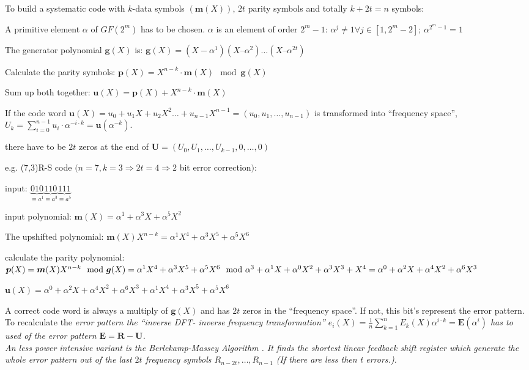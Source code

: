 To build a systematic code with $k$-data symbols $(\bm m(X))$, $2t$ parity symbols and totally $k+2t=n$ symbols:
\begin{liste}
\item A primitive element $\alpha$ of $GF(2^m)$ has to be chosen. 
$\alpha$ is an element of order $2^m-1$: $\alpha^j\neq 1 \forall j\in [1,2^m-2]$; $\alpha^{2^m-1}=1$
\item The generator polynomial $\bm g(X)$ is:  $\bm g(X)=(X - \alpha^1) (X – \alpha^2)\ldots (X – \alpha^{2t})$
\item Calculate the parity symbols: $\bm p(X)=X^{n-k}\cdot \bm m(X) \mod \bm g(X)$
\item Sum up both together: $\bm u(X)=\bm p(X) +X^{n-k}\cdot \bm m(X) $
\item If the code word $\bm u(X) = u_0 + u_1 X+u_2 X^2\ldots+u_{n-1}X^{n-1} = ( u_0,  u_1, \ldots,  u_{n-1})$ is transformed into ``frequency space'', 
$U_k = \sum\limits_{i=0}^{n-1} u_i\cdot \alpha^{-i\cdot k}=\bm u(\alpha^{-k})$.
\item there have to be $2t$ zeros at the end of $\bm U=(U_0,U_1,\ldots,U_{k-1},0,\ldots,0)$
\end{liste}
e.g. (7,3)R-S code $(n=7, k=3 \Rightarrow 2t=4 \Rightarrow 2$ bit error correction$)$:
\begin{liste}
\item input: $\underbrace{010}_{\equiv a^1} \underbrace{110}_{\equiv a^3} \underbrace{111}_{\equiv a^5}$
\item input polynomial: $\bm m(X)=\alpha^1 + \alpha^3 X + \alpha^5 X^2$ 
\item The upshifted polynomial: $\bm m(X) X^{n-k}=\alpha^1 X^4 + \alpha^3 X^5 + \alpha^5 X^6$
\item calculate the parity polynomial: $\bm p(X)=\bm m(X) X^{n-k} \mod \bm g(X)\\
= \alpha^1 X^4 + \alpha^3 X^5 + \alpha^5 X^6 \mod \alpha^3 + \alpha^1 X + \alpha^0 X^2+\alpha^3 X^3+ X^4=\alpha^0+\alpha^2 X+\alpha^4 X^2 + \alpha^6 X^3$
\item $\bm u(X)=\alpha^0 + \alpha^2 X + \alpha^4 X^2 + \alpha^6 X^3+ \alpha^1 X^4 + \alpha^3 X^5 + \alpha^5 X^6$
\end{liste}
A correct code word is always a multiply of $\bm g(X)$ and has $2t$ zeros in the ``frequency space''. If not, this bit's represent the error pattern. 
To recalculate the \em error pattern \em the ``inverse DFT- inverse frequency transformation'' 
$e_i(X)=\frac{1}{n}\sum\limits_{k=1}^n E_k(X) \alpha^{i \cdot k}=\bm E(\alpha^i)$ has to used of the  error pattern $\bm E= \bm R - \bm U$.\\
An less power intensive variant is the \em Berlekamp-Massey Algorithm \em. It finds the shortest linear feedback shift register which generate the 
whole error pattern out of the last $2t$ frequency symbols $R_{n-2t},\ldots,R_{n-1}$ (If there are less then t errors.).

